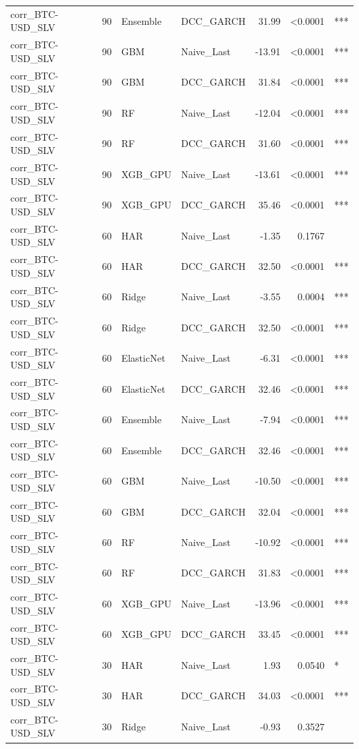 \begin{table}[H]
\begin{tabular}{llllrrl}
corr_BTC-USD_SLV & 90 & Ensemble & DCC_GARCH & 31.99 & <0.0001 & *** \\
corr_BTC-USD_SLV & 90 & GBM & Naive_Last & -13.91 & <0.0001 & *** \\
corr_BTC-USD_SLV & 90 & GBM & DCC_GARCH & 31.84 & <0.0001 & *** \\
corr_BTC-USD_SLV & 90 & RF & Naive_Last & -12.04 & <0.0001 & *** \\
corr_BTC-USD_SLV & 90 & RF & DCC_GARCH & 31.60 & <0.0001 & *** \\
corr_BTC-USD_SLV & 90 & XGB_GPU & Naive_Last & -13.61 & <0.0001 & *** \\
corr_BTC-USD_SLV & 90 & XGB_GPU & DCC_GARCH & 35.46 & <0.0001 & *** \\
corr_BTC-USD_SLV & 60 & HAR & Naive_Last & -1.35 & 0.1767 &  \\
corr_BTC-USD_SLV & 60 & HAR & DCC_GARCH & 32.50 & <0.0001 & *** \\
corr_BTC-USD_SLV & 60 & Ridge & Naive_Last & -3.55 & 0.0004 & *** \\
corr_BTC-USD_SLV & 60 & Ridge & DCC_GARCH & 32.50 & <0.0001 & *** \\
corr_BTC-USD_SLV & 60 & ElasticNet & Naive_Last & -6.31 & <0.0001 & *** \\
corr_BTC-USD_SLV & 60 & ElasticNet & DCC_GARCH & 32.46 & <0.0001 & *** \\
corr_BTC-USD_SLV & 60 & Ensemble & Naive_Last & -7.94 & <0.0001 & *** \\
corr_BTC-USD_SLV & 60 & Ensemble & DCC_GARCH & 32.46 & <0.0001 & *** \\
corr_BTC-USD_SLV & 60 & GBM & Naive_Last & -10.50 & <0.0001 & *** \\
corr_BTC-USD_SLV & 60 & GBM & DCC_GARCH & 32.04 & <0.0001 & *** \\
corr_BTC-USD_SLV & 60 & RF & Naive_Last & -10.92 & <0.0001 & *** \\
corr_BTC-USD_SLV & 60 & RF & DCC_GARCH & 31.83 & <0.0001 & *** \\
corr_BTC-USD_SLV & 60 & XGB_GPU & Naive_Last & -13.96 & <0.0001 & *** \\
corr_BTC-USD_SLV & 60 & XGB_GPU & DCC_GARCH & 33.45 & <0.0001 & *** \\
corr_BTC-USD_SLV & 30 & HAR & Naive_Last & 1.93 & 0.0540 & * \\
corr_BTC-USD_SLV & 30 & HAR & DCC_GARCH & 34.03 & <0.0001 & *** \\
corr_BTC-USD_SLV & 30 & Ridge & Naive_Last & -0.93 & 0.3527 &  \\

\end{tabular}
\end{table}
